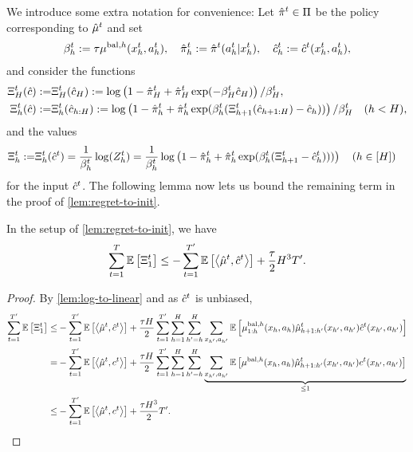 \noindent We introduce some extra notation for convenience: Let $\hat{\pi}^t\in\Pi$ be the policy corresponding to $\hat{\mu}^t$ and set
\begin{align*}
    \beta_h^t := \tau \mu^{\text{bal},h}(x_h^t,a_h^t), \quad
    \hat{\pi}^t_h := \hat{\pi}^t(a_h^t|x_h^t), \quad 
    \hat{c}^t_h := \hat{c}^t(x_h^t,a_h^t),
\end{align*}
and consider the functions 
\begin{align*}
    \Xi_H^t(\hat{c}) :=& \Xi_H^t(\hat{c}_{H}) := \log\left( 1-\hat{\pi}_H^t + \hat{\pi}_H^t\exp(-\beta_H^t\hat{c}_H) \right) / \beta_H^t,\\
    \Xi_h^t(\hat{c}) :=& \Xi_h^t(\hat{c}_{h:H}) := \log\left( 1-\hat{\pi}_h^t + \hat{\pi}_h^t\exp(\beta_h^t(\Xi_{h+1}^t(\hat{c}_{h+1:H})-\hat{c}_h)) \right) / \beta_H^t \quad (h<H),
\end{align*}
and the values
\begin{align*}
    \Xi_h^t :=& \Xi_h^t(\hat{c}^t) = \frac{1}{\beta_h^t} \log(Z^t_h) = \frac{1}{\beta_h^t} \log\left(  1-\hat{\pi}_h^t + \hat{\pi}_h^t\exp(\beta_h^t(\Xi_{h+1}^t - \hat{c}^t_h)))  \right) \quad (h\in[H])
\end{align*}
for the input $\hat{c}^t$. The following lemma now lets us bound the remaining term in the proof of \cref{lem:regret-to-init}.

\begin{lemma} \label{lem:sum-xi}
    In the setup of \cref{lem:regret-to-init}, we have 
    \begin{align*}
        \sum_{t=1}^T \mathbb{E}\left[ \Xi_1^t \right] \leq -\sum_{t=1}^{T'} \mathbb{E}\left[ \left\langle \hat{\mu}^t, \hat{c}^t \right\rangle \right] + \frac{\tau}{2} H^3 {T'}.
    \end{align*}
\end{lemma}

\begin{proof}
    By \cref{lem:log-to-linear} and as $\hat{c}^t$ is unbiased,
    \begin{align*}
        \sum_{t=1}^{T'} \mathbb{E}\left[ \Xi_1^t \right] \leq& -\sum_{t=1}^{T'} \mathbb{E}\left[ \left\langle \hat{\mu}^t, \hat{c}^t \right\rangle \right] + \frac{\tau H}{2} \sum_{t=1}^{T'} \sum_{h=1}^{H} \sum_{h'=h}^H \sum_{x_{h'},a_{h'}} \mathbb{E}\left[ \mu^{\text{bal},h}_{1:h}(x_{h},a_{h}) \hat{\mu}^{t}_{h+1:h'}(x_{h'},a_{h'}) \hat{c}^t(x_{h'},a_{h'}) \right]\\
        =& -\sum_{t=1}^{T'} \mathbb{E}\left[ \left\langle \hat{\mu}^t, c^t \right\rangle \right] + \frac{\tau H}{2} \sum_{t=1}^{T'} \sum_{h=1}^{H} \sum_{h'=h}^H \underbrace{\sum_{x_{h'},a_{h'}} \mathbb{E}\left[ \mu^{\text{bal},h}(x_{h},a_{h}) \hat{\mu}^{t}_{h+1:h'}(x_{h'},a_{h'}) c^t(x_{h'},a_{h'}) \right]}_{\leq 1}\\ 
        \leq& -\sum_{t=1}^{T'} \mathbb{E}\left[ \left\langle \hat{\mu}^t, c^t \right\rangle \right] + \frac{\tau H^3}{2} T'. 
    \end{align*}
\end{proof}

